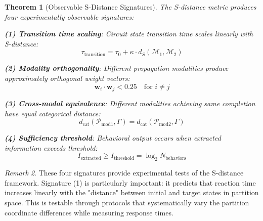 \documentclass[aps,prd,twocolumn,superscriptaddress,floatfix,nofootinbib]{revtex4-2}
\newtheorem{theorem}{Theorem}[section]
\theoremstyle{remark}
\newtheorem{remark}[theorem]{Remark}
\begin{document}
\begin{theorem}[Observable S-Distance Signatures]
\label{thm:sdistance_observables}
The S-distance metric produces four experimentally observable signatures:

\textbf{(1) Transition time scaling}: Circuit state transition time scales linearly with S-distance:
$$
\tau_{\text{transition}} = \tau_0 + \kappa \cdot d_S(\mathcal{M}_1, \mathcal{M}_2)
$$

\textbf{(2) Modality orthogonality}: Different propagation modalities produce approximately orthogonal weight vectors:
$$
\mathbf{w}_i \cdot \mathbf{w}_j < 0.25 \quad \text{for } i \neq j
$$

\textbf{(3) Cross-modal equivalence}: Different modalities achieving same completion have equal categorical distance:
$$
d_{\text{cat}}(\mathcal{P}_{\text{mod1}}, \Gamma) = d_{\text{cat}}(\mathcal{P}_{\text{mod2}}, \Gamma)
$$

\textbf{(4) Sufficiency threshold}: Behavioral output occurs when extracted information exceeds threshold:
$$
I_{\text{extracted}} \geq I_{\text{threshold}} = \log_2 N_{\text{behaviors}}
$$
\end{theorem}

\begin{remark}
These four signatures provide experimental tests of the S-distance framework. Signature (1) is particularly important: it predicts that reaction time increases linearly with the "distance" between initial and target states in partition space. This is testable through protocols that systematically vary the partition coordinate differences while measuring response times.
\end{remark}
\end{document}
